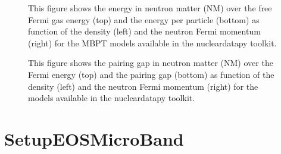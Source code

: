 \documentclass[letterpaper,10pt,english]{sphinxmanual}
\begin{document}
\begin{figure}[htbp]
\centering
\capstart

\noindent{}
\caption{This figure shows the energy in neutron matter (NM) over the free Fermi gas energy (top) and the energy per particle (bottom) as function of the density (left) and the neutron Fermi momentum (right) for the MBPT models available in the nucleardatapy toolkit.}\label{\detokenize{source/api/setup_eos_micro:id5}}\end{figure}

\begin{figure}[htbp]
\centering
\capstart

\noindent{}
\caption{This figure shows the pairing gap in neutron matter (NM) over the Fermi energy (top) and the pairing gap (bottom) as function of the density (left) and the neutron Fermi momentum (right) for the models available in the nucleardatapy toolkit.}\label{\detokenize{source/api/setup_eos_micro:id6}}\end{figure}

\sphinxstepscope


\section{SetupEOSMicroBand}
\label{\detokenize{source/api/setup_eos_micro_band:setupeosmicroband}}\label{\detokenize{source/api/setup_eos_micro_band::doc}}\label{\detokenize{source/api/setup_eos_micro_band:module-nucleardatapy.setup_eos_micro_band}}
\end{document}
